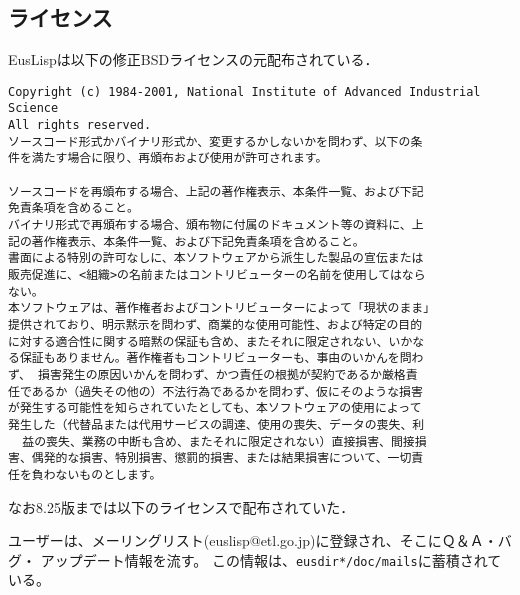 \subsection{\label{License}ライセンス}
EusLispは以下の修正BSDライセンスの元配布されている．

\begin{verbatim}
Copyright (c) 1984-2001, National Institute of Advanced Industrial Science
All rights reserved.
ソースコード形式かバイナリ形式か、変更するかしないかを問わず、以下の条
件を満たす場合に限り、再頒布および使用が許可されます。

ソースコードを再頒布する場合、上記の著作権表示、本条件一覧、および下記
免責条項を含めること。
バイナリ形式で再頒布する場合、頒布物に付属のドキュメント等の資料に、上
記の著作権表示、本条件一覧、および下記免責条項を含めること。
書面による特別の許可なしに、本ソフトウェアから派生した製品の宣伝または
販売促進に、<組織>の名前またはコントリビューターの名前を使用してはなら
ない。
本ソフトウェアは、著作権者およびコントリビューターによって「現状のまま」
提供されており、明示黙示を問わず、商業的な使用可能性、および特定の目的
に対する適合性に関する暗黙の保証も含め、またそれに限定されない、いかな
る保証もありません。著作権者もコントリビューターも、事由のいかんを問わ
ず、 損害発生の原因いかんを問わず、かつ責任の根拠が契約であるか厳格責
任であるか（過失その他の）不法行為であるかを問わず、仮にそのような損害
が発生する可能性を知らされていたとしても、本ソフトウェアの使用によって
発生した（代替品または代用サービスの調達、使用の喪失、データの喪失、利
  益の喪失、業務の中断も含め、またそれに限定されない）直接損害、間接損
害、偶発的な損害、特別損害、懲罰的損害、または結果損害について、一切責
任を負わないものとします。
\end{verbatim}

なお8.25版までは以下のライセンスで配布されていた．

ユーザーは、メーリングリスト(euslisp@etl.go.jp)に登録され、そこにＱ＆Ａ・バグ・
アップデート情報を流す。
この情報は、{\tt *eusdir*/doc/mails}に蓄積されている。

